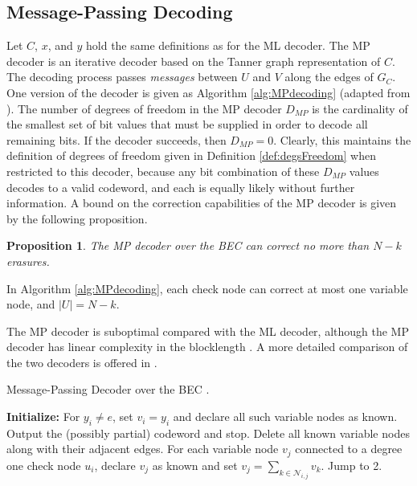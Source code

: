 \documentclass[10pt,twocolumn,twoside]{IEEEtran} \newlength{\pic}
\newtheorem{proposition}{Proposition}
\theoremstyle{definition}
\theoremstyle{remark}
\theoremstyle{plain}
\begin{document}
\subsection{Message-Passing Decoding}\label{subsec:MP}

Let $C$, $x$, and $y$ hold the same definitions as for the ML decoder. The MP decoder is an iterative decoder based on the Tanner graph representation of $C$. The decoding process passes \emph{messages} between $U$ and $V$ along the edges of $G_C$. One version of the decoder is given as Algorithm \ref{alg:MPdecoding} (adapted from \cite{Urbanke01}). The number of degrees of freedom in the MP decoder $D_{MP}$ is the cardinality of the smallest set of bit values that must be supplied in order to decode all remaining bits. If the decoder succeeds, then $D_{MP} = 0$. Clearly, this maintains the definition of degrees of freedom given in Definition \ref{def:degsFreedom} when restricted to this decoder, because any bit combination of these $D_{MP}$ values decodes to a valid codeword, and each is equally likely without further information. A bound on the correction capabilities of the MP decoder is given by the following proposition.
\begin{proposition}\label{prop:maxDecodMP}
  The MP decoder over the BEC can correct no more than $N-k$ erasures.
\end{proposition}
\begin{IEEEproof}
 In Algorithm \ref{alg:MPdecoding}, each check node can correct at most one variable node, and $|U|=N-k$.
\end{IEEEproof}
The MP decoder is suboptimal compared with the ML decoder, although the MP decoder has linear complexity in the blocklength \cite{MoonArches}. A more detailed comparison of the two decoders is offered in \cite{Lee07}.

\begin{algorithm}[h]
\caption{Message-Passing Decoder over the BEC \cite{Urbanke01}.}
\begin{algorithmic}[1]
\STATE \textbf{Initialize:} For $y_i \neq e$, set $v_i = y_i$ and declare all such variable nodes as known.
    \STATE Output the (possibly partial) codeword and stop.
  \ELSE
    \STATE Delete all known variable nodes along with their adjacent edges.
  \ENDIF
  \STATE For each variable node $v_j$ connected to a degree one check node $u_i$, declare $v_j$ as known and set $v_j = \sum_{k\in \mathcal{N}_{i,j}}v_k$. Jump to 2.
\end{algorithmic}
\label{alg:MPdecoding}
\end{algorithm}
\end{document}
